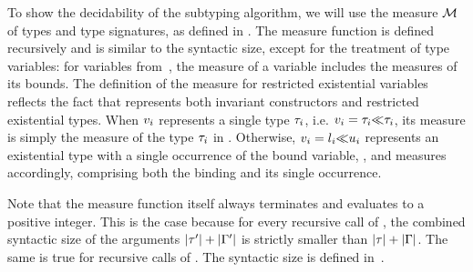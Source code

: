 To show the decidability of the subtyping algorithm,
we will use the measure $\operatorname{\mathcal{M}}$ of types and type signatures,
as defined in .
The measure function is defined recursively and is
similar to the syntactic size,
except for the treatment of type variables: for variables from~\AEnv,
the measure of a variable includes the measures of its bounds.
The definition of the measure for restricted existential variables \rexvar
reflects the fact that \tyinv{} represents both
invariant constructors and restricted existential types.
When $v_i$ represents a single type $\tau_i$,
i.e. $v_i = \tau_i{\operatorname{\ll}}\tau_i$,
its measure is simply the measure of the type $\tau_i$ in
\tyinv{}.
Otherwise, $v_i = l_i{\operatorname{\ll}}u_i$ represents
an existential type with a single occurrence of the bound variable,
,
and measures accordingly, comprising both the binding and its single occurrence.

Note that the measure function itself always terminates and evaluates to a
positive integer. This is the case because for every recursive call
 of \tymsrdflt{\ty}, 
the combined syntactic size of the arguments $|\tau'| + |\Gamma'|$
is strictly smaller than $|\tau| + |\Gamma|$.
The same is true for recursive calls
 of \tymsrdflt{\tysig}.
The syntactic size is defined in~.

